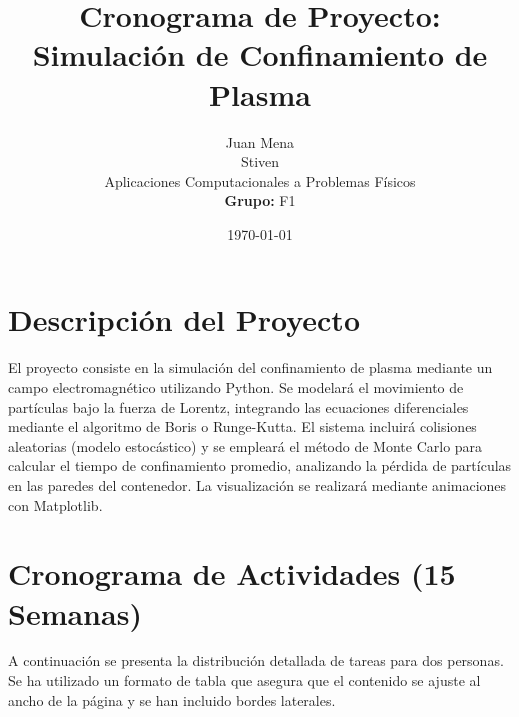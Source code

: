 \documentclass[11pt]{article}
\title{\textbf{Cronograma de Proyecto: Simulación de Confinamiento de Plasma}}
\author{%
  Juan Mena \\
  Stiven\\
  Aplicaciones Computacionales a Problemas Físicos \\
  \textbf{Grupo:} F1
}
\date{\today}
\begin{document}
\maketitle
\thispagestyle{fancy}

\section{Descripción del Proyecto}
El proyecto consiste en la simulación del confinamiento de plasma mediante un campo electromagnético utilizando Python. Se modelará el movimiento de partículas bajo la fuerza de Lorentz, integrando las ecuaciones diferenciales mediante el algoritmo de Boris o Runge-Kutta. El sistema incluirá colisiones aleatorias (modelo estocástico) y se empleará el método de Monte Carlo para calcular el tiempo de confinamiento promedio, analizando la pérdida de partículas en las paredes del contenedor. La visualización se realizará mediante animaciones con Matplotlib.

\section{Cronograma de Actividades (15 Semanas)}

A continuación se presenta la distribución detallada de tareas para dos personas. Se ha utilizado un formato de tabla que asegura que el contenido se ajuste al ancho de la página y se han incluido bordes laterales.
\end{document}
